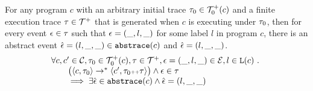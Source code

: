 \begin{lemma}
    For any program $c$ with 
    an arbitrary initial trace $\mathtt{\tau}_0 \in \mathcal{T}^{+}_0(c)$ and
    a finite execution trace $\mathtt{\tau} \in \mathcal{T}^{+}$ that is generated 
    when $c$ is executing under $\mathtt{\tau}_0$,
    then for every event $\mathtt{\epsilon} \in \mathtt{\tau}$ such that $\mathtt{\epsilon} = (\_, l, \_)$ for some label $l$ in program $c$,
    there is an abstract event $\hat{\mathtt{\epsilon}{}} = (l, \_, \_) \in \mathtt{abs}{\mathtt{trace}}(c)$ and $\hat{\mathtt{\epsilon}{}} = (l, \_, \_)$.
  \[
  \begin{array}{l}
    \forall c, c' \in \mathcal{C}, \mathtt{\tau}_0 \in \mathcal{T}^{+}_0(c), \mathtt{\tau} \in \mathcal{T}^{+} ,  \mathtt{\epsilon} = (\_, l, \_) \in \mathcal{E}, l \in \mathtt{L}(c) ~.~
    \\
    \qquad 
    \big(
      \langle {c}, \mathtt{\tau}_0 \rangle \to^{*} \langle c', \mathtt{\tau}_0 {\scriptscriptstyle ++} \mathtt{\tau} \rangle 
    \big)
    \land \mathtt{\epsilon} \in \mathtt{\tau} 
    \\
    \qquad \implies \exists 
    \hat{\mathtt{\epsilon}{}} \in \mathtt{abs}{\mathtt{trace}}(c) \land \hat{\mathtt{\epsilon}{}} = (l, \_, \_)
  \end{array}
  \]
  \end{lemma}

